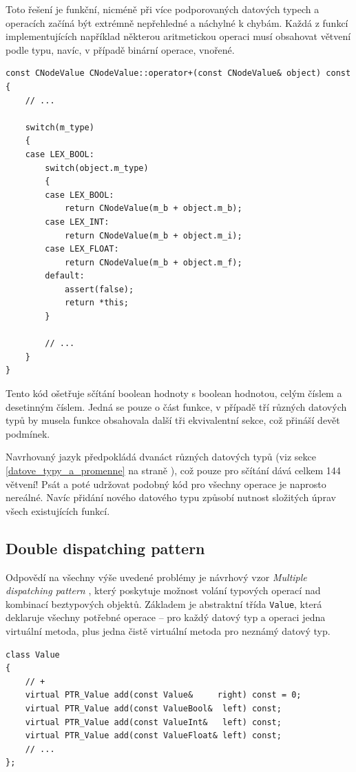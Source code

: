 \documentclass[11pt,twoside,a4paper]{book}
\begin{document}
Toto řešení je funkční, nicméně při více podporovaných datových typech a operacích začíná být extrémně nepřehledné a náchylné k chybám. Každá z funkcí implementujících například některou aritmetickou operaci musí obsahovat větvení podle typu, navíc, v případě binární operace, vnořené.

\begin{verbatim}
const CNodeValue CNodeValue::operator+(const CNodeValue& object) const
{
    // ...

    switch(m_type)
    {
    case LEX_BOOL:
        switch(object.m_type)
        {
        case LEX_BOOL:
            return CNodeValue(m_b + object.m_b);
        case LEX_INT:
            return CNodeValue(m_b + object.m_i);
        case LEX_FLOAT:
            return CNodeValue(m_b + object.m_f);
        default:
            assert(false);
            return *this;
        }

        // ...
    }
}
\end{verbatim}

Tento kód ošetřuje sčítání boolean hodnoty s boolean hodnotou, celým číslem a desetinným číslem. Jedná se pouze o část funkce, v případě tří různých datových typů by musela funkce obsahovala další tři ekvivalentní sekce, což přináší devět podmínek.

Navrhovaný jazyk předpokládá dvanáct různých datových typů (viz sekce \ref{datove_typy_a_promenne} na straně \pageref{datove_typy_a_promenne}), což pouze pro sčítání dává celkem 144 větvení! Psát a poté udržovat podobný kód pro všechny operace je naprosto nereálné. Navíc přidání nového datového typu způsobí nutnost slo\-ži\-tých úprav všech existujících funkcí.


\subsection{Double dispatching pattern}
\label{double_dispatching_pattern}

Odpovědí na všechny výše uvedené problémy je návrhový vzor \textit{Multiple dispatching pattern} \cite[str. 679]{eckel}, který poskytuje možnost volání typových operací nad kombinací beztypových objektů. Základem je abstraktní třída \texttt{Value}, která deklaruje všechny potřebné operace -- pro každý datový typ a operaci jedna virtuální metoda, plus jedna čistě virtuální metoda pro neznámý datový typ.

\begin{verbatim}
class Value
{
    // +
    virtual PTR_Value add(const Value&     right) const = 0;
    virtual PTR_Value add(const ValueBool&  left) const;
    virtual PTR_Value add(const ValueInt&   left) const;
    virtual PTR_Value add(const ValueFloat& left) const;
    // ...
};
\end{verbatim}
\end{document}
